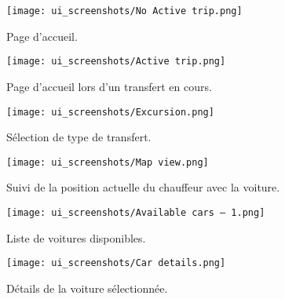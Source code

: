 \begin{multicols}{2}
    \begin{figure}[H]
        \centering
        \texttt{[image: ui\_screenshots/No Active trip.png]}
        \vspace{1cm}
        \captionsetup{justification=centering}

        \caption{\centering Page d'accueil.}
        \label{fig:no_active_trip}
    \end{figure}
    \begin{figure}[H]
        \centering
        \texttt{[image: ui\_screenshots/Active trip.png]}
        \vspace{1cm}
        \captionsetup{justification=centering}

        \caption{\centering Page d'accueil lors d'un transfert en cours.}
        \label{fig:active_trip}
    \end{figure}
\end{multicols}
\clearpage
\begin{multicols}{2}
    \begin{figure}[H]
        \centering
        \texttt{[image: ui\_screenshots/Excursion.png]}
        \vspace{1cm}
        \captionsetup{justification=centering}

        \caption{\centering Sélection de type de transfert.}
        \label{fig:trip_select}
    \end{figure}
    \begin{figure}[H]
        \centering
        \texttt{[image: ui\_screenshots/Map view.png]}
        \vspace{1cm}
        \captionsetup{justification=centering}

        \caption{\centering Suivi de la position actuelle du chauffeur avec la voiture.}
        \label{fig:follow_driver}
    \end{figure}
\end{multicols}
\begin{multicols}{2}
    \begin{figure}[H]
        \centering
        \texttt{[image: ui\_screenshots/Available cars – 1.png]}
        \vspace{1cm}
        \captionsetup{justification=centering}

        \caption{\centering Liste de voitures disponibles.}
        \label{fig:available_cars}
    \end{figure}
    \begin{figure}[H]
        \centering
        \texttt{[image: ui\_screenshots/Car details.png]}
        \vspace{1cm}
        \captionsetup{justification=centering}

        \caption{\centering Détails de la voiture sélectionnée.}
        \label{fig:car_details}
    \end{figure}
\end{multicols}
